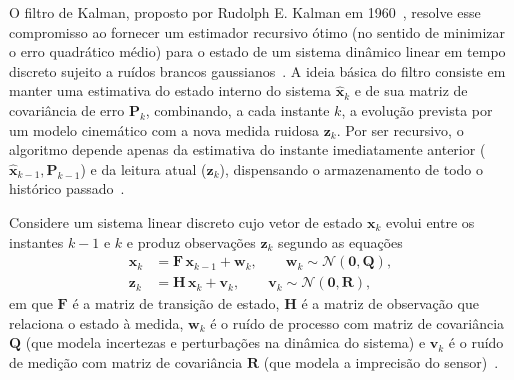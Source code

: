 O filtro de Kalman, proposto por Rudolph E. Kalman em 1960~\cite{kalman1960new}, resolve esse compromisso ao fornecer um estimador recursivo ótimo (no sentido de minimizar o erro quadrático médio) para o estado de um sistema dinâmico linear em tempo discreto sujeito a ruídos brancos gaussianos~\cite{welch2006kalman}. A ideia básica do filtro consiste em manter uma estimativa do estado interno do sistema $\hat{\mathbf{x}}_k$ e de sua matriz de covariância de erro $\mathbf{P}_k$, combinando, a cada instante $k$, a evolução prevista por um modelo cinemático com a nova medida ruidosa $\mathbf{z}_k$. Por ser recursivo, o algoritmo depende apenas da estimativa do instante imediatamente anterior ($\hat{\mathbf{x}}_{k-1}, \mathbf{P}_{k-1}$) e da leitura atual ($\mathbf{z}_k$), dispensando o armazenamento de todo o histórico passado~\cite{welch2006kalman}.

Considere um sistema linear discreto cujo vetor de estado $\mathbf{x}_k$ evolui entre os instantes $k-1$ e $k$ e produz observações $\mathbf{z}_k$ segundo as equações
\begin{align}
    \mathbf{x}_k &= \mathbf{F}\,\mathbf{x}_{k-1} + \mathbf{w}_k, \qquad \mathbf{w}_k \sim \mathcal{N}(\mathbf{0}, \mathbf{Q}), \label{eq:kalman_estado} \\
    \mathbf{z}_k &= \mathbf{H}\,\mathbf{x}_k + \mathbf{v}_k, \qquad \mathbf{v}_k \sim \mathcal{N}(\mathbf{0}, \mathbf{R}), \label{eq:kalman_observacao}
\end{align}
em que $\mathbf{F}$ é a matriz de transição de estado, $\mathbf{H}$ é a matriz de observação que relaciona o estado à medida, $\mathbf{w}_k$ é o ruído de processo com matriz de covariância $\mathbf{Q}$ (que modela incertezas e perturbações na dinâmica do sistema) e $\mathbf{v}_k$ é o ruído de medição com matriz de covariância $\mathbf{R}$ (que modela a imprecisão do sensor)~\cite{kalman1960new,welch2006kalman}.

